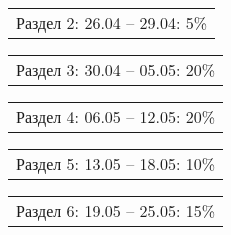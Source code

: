 \documentclass[12pt, А4, twoside]{article}
\begin{document}
\begin{FlushLeft}
    \begin{tabular}{p{17.25cm}}
        \hspace{0.3cm} \textsf{Раздел 2:} \hspace{2.54cm} \textsf{ 26.04 {--} 29.04:} \hspace{0.5cm} \textsf{5\%} \vspace{0pt} \hline \\
    \end{tabular}

    \vspace{-0.1 cm}

    \begin{tabular}{p{17.25cm}}
        \hspace{0.3cm} \textsf{Раздел 3:} \hspace{2.54cm} \textsf{ 30.04 {--} 05.05:} \hspace{0.5cm} \textsf{20\%} \vspace{0pt} \hline \\
    \end{tabular}

    \vspace{-0.1 cm}

    \begin{tabular}{p{17.25cm}}
        \hspace{0.3cm} \textsf{Раздел 4:} \hspace{2.54cm} \textsf{ 06.05 {--} 12.05:} \hspace{0.5cm} \textsf{20\%} \vspace{0pt} \hline \\
    \end{tabular}

    \vspace{-0.1 cm}

    \begin{tabular}{p{17.25cm}}
        \hspace{0.3cm} \textsf{Раздел 5:} \hspace{2.54cm} \textsf{ 13.05 {--} 18.05:} \hspace{0.5cm} \textsf{10\%} \vspace{0pt} \hline \\
    \end{tabular}

    \vspace{-0.1 cm}

    \begin{tabular}{p{17.25cm}}
        \hspace{0.3cm} \textsf{Раздел 6:} \hspace{2.54cm} \textsf{ 19.05 {--} 25.05:} \hspace{0.5cm} \textsf{15\%} \vspace{0pt} \hline \\
    \end{tabular}


\end{FlushLeft}
\end{document}
